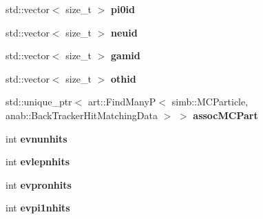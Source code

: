 \begin{DoxyCompactItemize}
\item 
std\+::vector$<$ size\+\_\+t $>$ {\bfseries pi0id}\hypertarget{classanalysis_1_1SlicePurCompl_aaa4d7b9339cb5e7e1b2abce6b4784532}{}\label{classanalysis_1_1SlicePurCompl_aaa4d7b9339cb5e7e1b2abce6b4784532}

\item 
std\+::vector$<$ size\+\_\+t $>$ {\bfseries neuid}\hypertarget{classanalysis_1_1SlicePurCompl_a1f6b97343b50a45f6d08c9b7a77cafc8}{}\label{classanalysis_1_1SlicePurCompl_a1f6b97343b50a45f6d08c9b7a77cafc8}

\item 
std\+::vector$<$ size\+\_\+t $>$ {\bfseries gamid}\hypertarget{classanalysis_1_1SlicePurCompl_a4123f24a7b7c48a0b8d035d8f6cd8855}{}\label{classanalysis_1_1SlicePurCompl_a4123f24a7b7c48a0b8d035d8f6cd8855}

\item 
std\+::vector$<$ size\+\_\+t $>$ {\bfseries othid}\hypertarget{classanalysis_1_1SlicePurCompl_ab09dc6647525b89ebee6e9ee622cce58}{}\label{classanalysis_1_1SlicePurCompl_ab09dc6647525b89ebee6e9ee622cce58}

\item 
std\+::unique\+\_\+ptr$<$ art\+::\+Find\+ManyP$<$ simb\+::\+M\+C\+Particle, anab\+::\+Back\+Tracker\+Hit\+Matching\+Data $>$ $>$ {\bfseries assoc\+M\+C\+Part}\hypertarget{classanalysis_1_1SlicePurCompl_aee3dce7966b5e1ea71c93413bcbc6d8a}{}\label{classanalysis_1_1SlicePurCompl_aee3dce7966b5e1ea71c93413bcbc6d8a}

\item 
int {\bfseries evnunhits}\hypertarget{classanalysis_1_1SlicePurCompl_abb4d90c2bccf98be8583ee7ec4786e7b}{}\label{classanalysis_1_1SlicePurCompl_abb4d90c2bccf98be8583ee7ec4786e7b}

\item 
int {\bfseries evlepnhits}\hypertarget{classanalysis_1_1SlicePurCompl_acb6c47c5f5079404267f46ad6ccd843e}{}\label{classanalysis_1_1SlicePurCompl_acb6c47c5f5079404267f46ad6ccd843e}

\item 
int {\bfseries evpronhits}\hypertarget{classanalysis_1_1SlicePurCompl_a3b7e6beaede5fdaab4b4d58e3702fea1}{}\label{classanalysis_1_1SlicePurCompl_a3b7e6beaede5fdaab4b4d58e3702fea1}

\item 
int {\bfseries evpi1nhits}\hypertarget{classanalysis_1_1SlicePurCompl_a2b450063c61b0408260de63628f3d544}{}\label{classanalysis_1_1SlicePurCompl_a2b450063c61b0408260de63628f3d544}


\end{DoxyCompactItemize}
